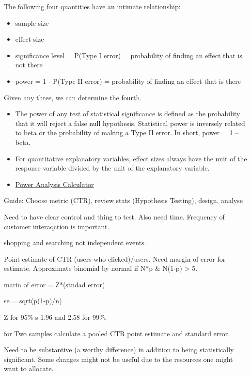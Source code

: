 \documentclass[]{book}
\begin{document}
The following four quantities have an intimate relationship:

\begin{itemize}
\item
  sample size
\item
  effect size
\item
  significance level = P(Type I error) = probability of finding an
  effect that is not there
\item
  power = 1 - P(Type II error) = probability of finding an effect that
  is there
\end{itemize}

Given any three, we can determine the fourth.

\begin{itemize}
\item
  The power of any test of statistical significance is defined as the
  probability that it will reject a false null hypothesis. Statistical
  power is inversely related to beta or the probability of making a Type
  II error. In short, power = 1 -- beta.
\item
  For quantitative explanatory variables, effect sizes always have the
  unit of the response variable divided by the unit of the explanatory
  variable.
\item
  \href{http://www.evanmiller.org/ab-testing/sample-size.html}{Power
  Analysis Calculator}
\end{itemize}

Guide: Choose metric (CTR), review stats (Hypothesis Testing), design,
analyse

Need to have clear control and thing to test. Also need time. Frequency
of customer interaqction is important.

shopping and searching not independent events.

Point estimate of CTR (users who clicked)/users. Need margin of error
for estimate. Approximate binomial by normal if N*p \& N(1-p)
\textgreater{} 5.

marin of error = Z*(stndad error)

se = sqrt(p(1-p)/n)

Z for 95\% s 1.96 and 2.58 for 99\%.

for Two samples calculate a pooled CTR point estimate and standard
error.

Need to be substantive (a worthy difference) in addition to being
statistically significant. Some changes might not be useful due to the
resources one might want to allocate.
\end{document}
